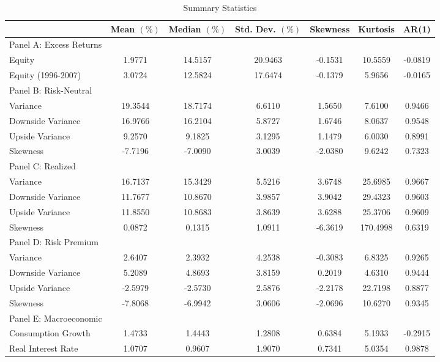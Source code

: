 \documentclass[11pt]{article}
\begin{document}
\begin{table}
  \begin{center}
  \caption{Summary Statistics }\label{TabSummaryStats}
\begin{footnotesize}\begin{tabular*}{0.95\textwidth}{@{\extracolsep{\fill}}lcccccc}
\hline%
&\textbf{Mean $(\%)$}&\textbf{Median $(\%)$}&\textbf{Std. Dev. $(\%)$}&\textbf{Skewness}&\textbf{Kurtosis}&\textbf{AR(1)}\\\hline
Panel A: Excess Returns \\\hline
Equity  &   1.9771& 14.5157&20.9463 &   -0.1531&    10.5559&    -0.0819 \\
Equity (1996-2007)&3.0724&12.5824&17.6474&-0.1379&5.9656&-0.0165\\
\hline
Panel B: Risk-Neutral   \\\hline
Variance&19.3544&18.7174&6.6110&1.5650&7.6100&0.9466\\
Downside Variance&16.9766&16.2104&5.8727&1.6746&8.0637&0.9548\\
Upside Variance&9.2570&9.1825&3.1295&1.1479&6.0030&0.8991\\
Skewness&-7.7196&-7.0090&3.0039&-2.0380&9.6242&0.7323\\\hline
Panel C: Realized      \\\hline
Variance&16.7137&15.3429&5.5216&3.6748&25.6985&0.9667\\
Downside Variance&11.7677&10.8670&3.9857&3.9042&29.4323&0.9603\\
Upside Variance&11.8550&10.8683&3.8639&3.6288&25.3706&0.9609\\
Skewness &0.0872&0.1315&1.0911&-6.3619&170.4998&0.6319\\\hline
Panel D: Risk Premium    \\\hline
Variance&2.6407&2.3932&4.2538&-0.3083&6.8325&0.9265\\
Downside Variance&5.2089&4.8693&3.8159&0.2019&4.6310&0.9444\\
Upside Variance&-2.5979&-2.5730&2.5876&-2.2178&22.7198&0.8877\\
Skewness &-7.8068&-6.9942&3.0606&-2.0696&10.6270&0.9345\\ \hline
Panel E: Macroeconomic \\\hline
Consumption Growth & 1.4733 & 1.4443 & 1.2808& 0.6384 & 5.1933 & -0.2915\\
Real Interest Rate & 1.0707 & 0.9607 & 1.9070 & 0.7341 & 5.0354 & 0.9878\\ \hline
\end{tabular*}
\end{footnotesize}
\end{center}


\end{table}
\end{document}
